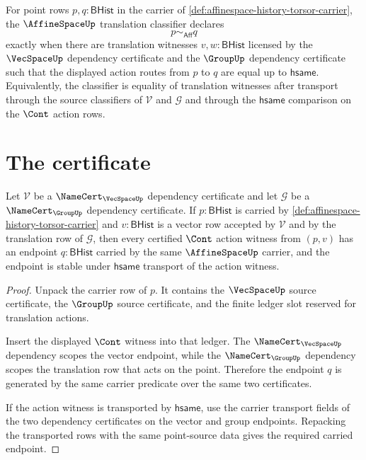 \begin{definition}
\label{def:affinespace-translation-classifier}
For point rows $p,q:\mathsf{BHist}$ in the carrier of \autoref{def:affinespace-history-torsor-carrier}, the $\AffineSpaceUp$ translation classifier declares
$$
p \sim_{\mathsf{Aff}} q
$$
exactly when there are translation witnesses $v,w:\mathsf{BHist}$ licensed by the $\VecSpaceUp$ dependency certificate and the $\GroupUp$ dependency certificate such that the displayed action routes from $p$ to $q$ are equal up to $\mathsf{hsame}$. Equivalently, the classifier is equality of translation witnesses after transport through the source classifiers of $\mathcal{V}$ and $\mathcal{G}$ and through the $\mathsf{hsame}$ comparison on the $\Cont$ action rows.
\end{definition}

\section{The certificate}
\label{sec:affinespace-certificate}

\begin{theorem}
\label{thm:affinespace-action-closure-obligation}
Let $\mathcal{V}$ be a $\NameCert_{\VecSpaceUp}$ dependency certificate and let $\mathcal{G}$ be a $\NameCert_{\GroupUp}$ dependency certificate. If $p:\mathsf{BHist}$ is carried by \autoref{def:affinespace-history-torsor-carrier} and $v:\mathsf{BHist}$ is a vector row accepted by $\mathcal{V}$ and by the translation row of $\mathcal{G}$, then every certified $\Cont$ action witness from $(p,v)$ has an endpoint $q:\mathsf{BHist}$ carried by the same $\AffineSpaceUp$ carrier, and the endpoint is stable under $\mathsf{hsame}$ transport of the action witness.
\end{theorem}
\begin{proof}
Unpack the carrier row of $p$. It contains the $\VecSpaceUp$ source certificate, the $\GroupUp$ source certificate, and the finite ledger slot reserved for translation actions.

Insert the displayed $\Cont$ witness into that ledger. The $\NameCert_{\VecSpaceUp}$ dependency scopes the vector endpoint, while the $\NameCert_{\GroupUp}$ dependency scopes the translation row that acts on the point. Therefore the endpoint $q$ is generated by the same carrier predicate over the same two certificates.

If the action witness is transported by $\mathsf{hsame}$, use the carrier transport fields of the two dependency certificates on the vector and group endpoints. Repacking the transported rows with the same point-source data gives the required carried endpoint.
\end{proof}

